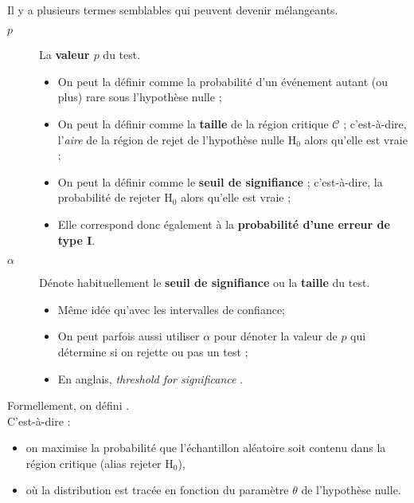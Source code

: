 \documentclass[10pt, french]{article}
\begin{document}
\begin{multicols*}{2}
\

Il y a plusieurs termes semblables qui peuvent devenir mélangeants.
\begin{distributions}[Terminologie]
\begin{description}
	\item[$p$]	La \textbf{valeur $p$} du test.
		\begin{itemize}
		\item	On peut la définir comme la probabilité d'un événement autant (ou plus) rare sous l'hypothèse nulle ;
		\item	On peut la définir comme la \textbf{taille} de la région critique $\mathcal{C}$ ; c'est-à-dire, l'\textit{aire} de la région de rejet de l'hypothèse nulle $\text{H}_{0}$ alors qu'elle est vraie ;
		\item	On peut la définir comme le \textbf{seuil de signifiance} ; c'est-à-dire, la probabilité de rejeter $\text{H}_{0}$ alors qu'elle est vraie ;
		\item	Elle correspond donc également à la \textbf{probabilité d'une erreur de type I}.
		\end{itemize}
	\item[$\alpha$]	Dénote habituellement le \textbf{seuil de signifiance} ou la \textbf{taille} du test.
		\begin{itemize}
		\item	Même idée qu'avec les intervalles de confiance;
		\item	On peut parfois aussi utiliser $\alpha$ pour dénoter la valeur de $p$ qui détermine si on rejette ou pas un test ;
		\item	En anglais, \og \textit{threshold for significance} \fg{}.
		\end{itemize}
\end{description}
\end{distributions}

Formellement, on défini . \\
C'est-à-dire :
\begin{itemize}
	\item	on \textcolor{indigo(web)}{maximise} la probabilité que \textcolor{bondiblue!80!black}{l'échantillon aléatoire} soit \textcolor{armygreen}{contenu} dans \textcolor{bulgarianrose!90!black}{la région critique} (alias rejeter $\textrm{H}_{0}$), 
	\item	où la distribution est tracée \textcolor{amethyst}{en fonction du paramètre $\theta$} de \textcolor{pastelred}{l'hypothèse nulle}.
\end{itemize}



\end{multicols*}
\end{document}
